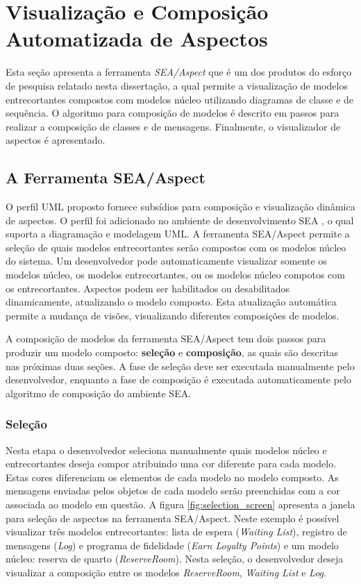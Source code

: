 \section{Visualização e Composição Automatizada de Aspectos}

Esta seção apresenta a ferramenta \textit{SEA/Aspect} que é um dos produtos do esforço de pesquisa relatado nesta dissertação, a qual permite a
visualização de modelos entrecortantes compostos com modelos núcleo utilizando diagramas de classe e de sequência. O algoritmo para composição de 
modelos é descrito em passos para realizar a composição de classes e de mensagens. Finalmente, o visualizador de aspectos é apresentado.

\subsection{A Ferramenta SEA/Aspect}

O perfil UML proposto fornece subsídios para composição e visualização dinâmica de aspectos. O perfil foi adicionado no ambiente de desenvolvimento
SEA \cite{silva:00}, o qual suporta a diagramação e modelagem UML. A ferramenta SEA/Aspect permite a seleção de quais modelos entrecortantes serão
compostos com os modelos núcleo do sistema. Um desenvolvedor pode automaticamente visualizar somente os modelos núcleo, os modelos entrecortantes, ou
os modelos núcleo compotos com os entrecortantes. Aspectos podem ser habilitados ou desabilitados dinamicamente, atualizando o modelo composto. Esta
atualização automática permite a mudança de visões, visualizando diferentes composições de modelos.

A composição de modelos da ferramenta SEA/Aspect tem dois passos para produzir um modelo composto: \textbf{seleção} e \textbf{composição},
as quais são descritas nas próximas duas seções. A fase de seleção deve ser executada manualmente pelo desenvolvedor, enquanto a fase de composição é
executada automaticamente pelo algoritmo de composição do ambiente SEA.

\subsubsection{Seleção}
  
Nesta etapa o desenvolvedor seleciona manualmente quais modelos núcleo e entrecortantes deseja compor atribuindo uma cor diferente para cada modelo.
Estas cores diferenciam os elementos de cada modelo no modelo composto. As mensagens enviadas pelos objetos de cada modelo serão preenchidas com a cor
associada ao modelo em questão. A figura \ref{fig:selection_screen} apresenta a janela para seleção de aspectos na ferramenta SEA/Aspect. Neste
exemplo é possível visualizar três modelos entrecortantes: lista de espera (\textit{Waiting List}), registro de mensagens (\textit{Log}) e
programa de fidelidade (\textit{Earn Loyalty Points}) e um modelo núcleo: reserva de quarto (\textit{ReserveRoom}). Nesta seleção, o desenvolvedor
deseja visualizar a composição entre os modelos \textit{ReserveRoom}, \textit{Waiting List} e \textit{Log}.

